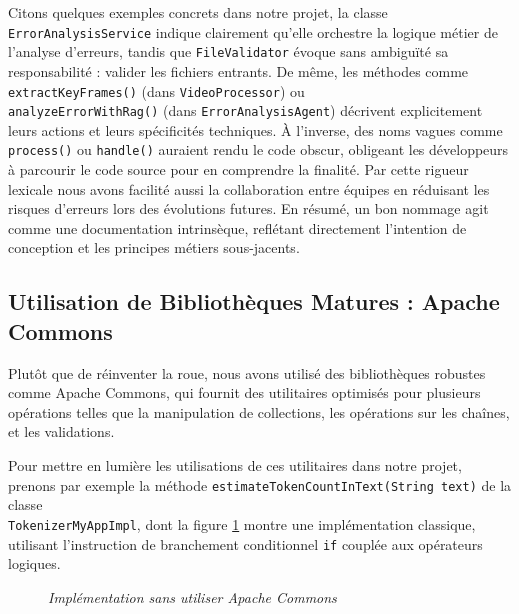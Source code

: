 \documentclass[12pt,a4paper]{report}
\begin{document}
	Citons quelques exemples concrets dans notre projet, la classe \verb|ErrorAnalysisService| indique clairement qu'elle orchestre la logique métier de l'analyse d'erreurs, tandis que \verb|FileValidator| évoque sans ambiguïté sa responsabilité : valider les fichiers entrants. De même, les méthodes comme \verb|extractKeyFrames()| (dans \verb|VideoProcessor|) ou \\ \verb|analyzeErrorWithRag()| (dans \verb|ErrorAnalysisAgent|) décrivent explicitement leurs actions et leurs spécificités techniques. À l'inverse, des noms vagues comme \verb|process()| ou \verb|handle()| auraient rendu le code obscur, obligeant les développeurs à parcourir le code source pour en comprendre la finalité. Par cette rigueur lexicale nous avons facilité aussi la collaboration entre équipes en réduisant les risques d'erreurs lors des évolutions futures. En résumé, un bon nommage agit comme une documentation intrinsèque, reflétant directement l’intention de conception et les principes métiers sous-jacents.
	
	\subsection{Utilisation de Bibliothèques Matures : Apache Commons}
	
	Plutôt que de réinventer la roue, nous avons utilisé des bibliothèques robustes comme Apache Commons, qui fournit des utilitaires optimisés pour plusieurs opérations telles que la manipulation de collections, les opérations sur les chaînes, et les validations.
	
	Pour mettre en lumière les utilisations de ces utilitaires dans notre projet, prenons par exemple la méthode \verb|estimateTokenCountInText(String text)| de la classe \\ \verb|TokenizerMyAppImpl|, dont la figure \ref{fig:before-string-utils} montre une implémentation classique, utilisant l'instruction de branchement conditionnel \verb|if| couplée aux opérateurs logiques.
	
	\begin{figure}[H]
		\centering
		\caption{\textit{Implémentation sans utiliser Apache Commons}}
		\label{fig:before-string-utils}
	\end{figure}
	
\end{document}
